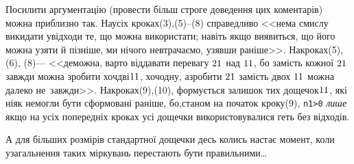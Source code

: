 Посилити аргументацію (провести більш строге доведення цих коментарів) можна приблизно так. На\nolinebreak[2] усіх кроках\nolinebreak[2] (3),\nolinebreak[1] \mbox{(5)--(8)} справедливо <<нема смислу викидати у\nolinebreak[3] відходи те, що можна використати; навіть якщо виявиться, що його можна узяти й пізніше, ми нічого не\nolinebreak[3] втрачаємо, узявши раніше>>. 
\label{text:proof-example-parket-1}
На\nolinebreak[3] кроках\nolinebreak[3] (5), \nolinebreak[1] (6), \nolinebreak[1] (8)\nolinebreak[3] --- <<де\nolinebreak[3] можна, варто віддавати перевагу $2{\*}1$ над $1{\*}1$, бо замість кожної $2{\*}1$ завжди можна зробити хоч\nolinebreak[1] дві\nolinebreak[3] $1{\*}1$, хоч\nolinebreak[1] одну, а\nolinebreak[3] зробити $2{\*}1$ замість двох $1{\*}1$ можна далеко не~завжди>>. На\nolinebreak[3] кроках\nolinebreak[2] (9),\nolinebreak[3] (10), формується залишок тих дощечок\nolinebreak[3] $1{\*}1$, які ніяк не\nolinebreak[3] могли бути сформовані раніше, бо,\nolinebreak[2] станом на початок кроку\nolinebreak[3] (9), \verb"n1>0" \emph{лише} якщо на усіх попередніх кроках усі дощечки використовувалися геть без відходів.

А для більших розмірів стандартної дощечки десь колись настає момент, коли узагальнення таких міркувань перестають бути правильними\dots